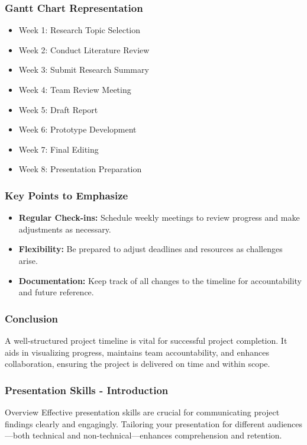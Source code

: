 \documentclass[aspectratio=169]{beamer}
\begin{document}
\begin{frame}[fragile]
    \frametitle{Gantt Chart Representation}
    \begin{itemize}
        \item Week 1: Research Topic Selection
        \item Week 2: Conduct Literature Review
        \item Week 3: Submit Research Summary
        \item Week 4: Team Review Meeting
        \item Week 5: Draft Report
        \item Week 6: Prototype Development
        \item Week 7: Final Editing
        \item Week 8: Presentation Preparation
    \end{itemize}
\end{frame}

\begin{frame}[fragile]
    \frametitle{Key Points to Emphasize}
    \begin{itemize}
        \item \textbf{Regular Check-ins:} Schedule weekly meetings to review progress and make adjustments as necessary.
        \item \textbf{Flexibility:} Be prepared to adjust deadlines and resources as challenges arise.
        \item \textbf{Documentation:} Keep track of all changes to the timeline for accountability and future reference.
    \end{itemize}
\end{frame}

\begin{frame}[fragile]
    \frametitle{Conclusion}
    A well-structured project timeline is vital for successful project completion. It aids in visualizing progress, maintains team accountability, and enhances collaboration, ensuring the project is delivered on time and within scope.
\end{frame}

\begin{frame}[fragile]
    \frametitle{Presentation Skills - Introduction}
    \begin{block}{Overview}
        Effective presentation skills are crucial for communicating project findings clearly and engagingly. Tailoring your presentation for different audiences—both technical and non-technical—enhances comprehension and retention.
    \end{block}
\end{frame}
\end{document}
